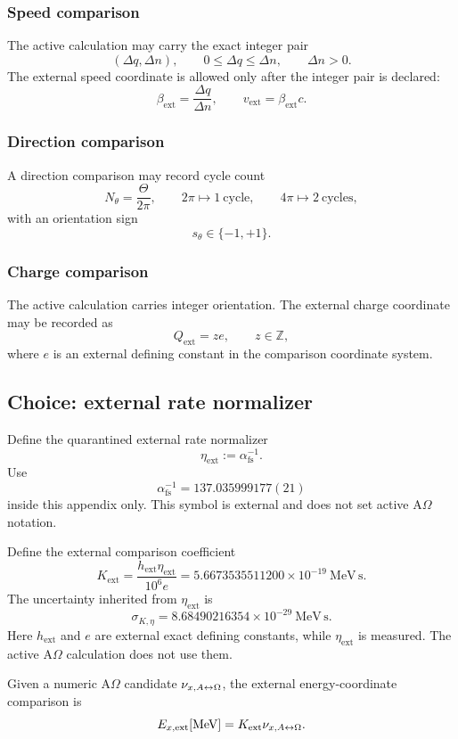 \subsubsection{Speed comparison}
The active calculation may carry the exact integer pair
\[
(\Delta q,\Delta n),
\qquad
0\le \Delta q\le \Delta n,
\qquad
\Delta n>0.
\]
The external speed coordinate is allowed only after the integer pair is declared:
\[
\beta_{\mathrm{ext}}=\frac{\Delta q}{\Delta n},
\qquad
v_{\mathrm{ext}}=\beta_{\mathrm{ext}}c.
\]

\subsubsection{Direction comparison}
A direction comparison may record cycle count
\[
N_\theta=\frac{\Theta}{2\pi},
\qquad
2\pi\mapsto1\ \mathrm{cycle},
\qquad
4\pi\mapsto2\ \mathrm{cycles},
\]
with an orientation sign
\[
s_\theta\in\{-1,+1\}.
\]

\subsubsection{Charge comparison}
The active calculation carries integer orientation. The external charge coordinate may be recorded as
\[
Q_{\mathrm{ext}}=ze,
\qquad z\in\mathbb Z,
\]
where \(e\) is an external defining constant in the comparison coordinate system.

\subsection{Choice: external rate normalizer}\label{manual:external-comparison:action-normalization}
Define the quarantined external rate normalizer
\[
\eta_{\mathrm{ext}}:=\alpha_{\mathrm{fs}}^{-1}.
\]
Use
\[
\alpha_{\mathrm{fs}}^{-1}=137.035999177(21)
\]
inside this appendix only. This symbol is external and does not set active A\(\Omega\) notation.

Define the external comparison coefficient
\[
K_{\mathrm{ext}}
=
\frac{h_{\mathrm{ext}}\eta_{\mathrm{ext}}}{10^6e}
=
5.6673535511200\times10^{-19}\ \mathrm{MeV\,s}.
\]
The uncertainty inherited from \(\eta_{\mathrm{ext}}\) is
\[
\sigma_{K,\eta}
=
8.68490216354\times10^{-29}\ \mathrm{MeV\,s}.
\]
Here \(h_{\mathrm{ext}}\) and \(e\) are external exact defining constants, while \(\eta_{\mathrm{ext}}\) is measured. The active A\(\Omega\) calculation does not use them.

Given a numeric A\(\Omega\) candidate \(\nu_{x,A{\leftrightarrow}\Omega}\), the external energy-coordinate comparison is
\[
E_{x,\mathrm{ext}}[\mathrm{MeV}]
=
K_{\mathrm{ext}}\nu_{x,A{\leftrightarrow}\Omega}.
\]

